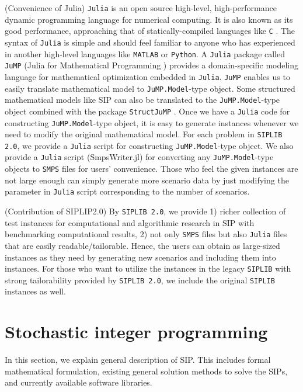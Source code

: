 (Convenience of Julia) \texttt{Julia} is an open source high-level, high-performance dynamic programming language for numerical computing. It is also known as its good performance, approaching that of statically-compiled languages like \texttt{C} \cite{journal:BEKS2017}. The syntax of \texttt{Julia} is simple and should feel familiar to anyone who has experienced in another high-level languages like \texttt{MATLAB} or \texttt{Python}. A \texttt{Julia} package called \texttt{JuMP} (Julia for Mathematical Programming \cite{web:JuMP}) provides a domain-specific modeling language for mathematical optimization embedded in \texttt{Julia}. \texttt{JuMP} enables us to easily translate mathematical model to \texttt{JuMP.Model}-type object. Some structured mathematical models like SIP can also be translated to the \texttt{JuMP.Model}-type object combined with the package \texttt{StructJuMP} \cite{web:StructJuMP}. Once we have a \texttt{Julia} code for constructing \texttt{JuMP.Model}-type object, it is easy to generate instances whenever we need to modify the original mathematical model. For each problem in \texttt{SIPLIB 2.0}, we provide a \texttt{Julia} script for constructing \texttt{JuMP.Model}-type object. We also provide a \texttt{Julia} script (SmpsWriter.jl) for converting any \texttt{JuMP.Model}-type objects to \texttt{SMPS} files for users' convenience. Those who feel the given instances are not large enough can simply generate more scenario data by just modifying the parameter in \texttt{Julia} script corresponding to the number of scenarios.

(Contribution of SIPLIP2.0) By \texttt{SIPLIB 2.0}, we provide 1) richer collection of test instances for computational and algorithmic research in SIP with benchmarking computational results, 2) not only \texttt{SMPS} files but also \texttt{Julia} files that are easily readable/tailorable. Hence, the users can obtain as large-sized instances as they need by generating new scenarios and including them into instances. For those who want to utilize the instances in the legacy \texttt{SIPLIB} with strong tailorability provided by \texttt{SIPLIB 2.0}, we include the original \texttt{SIPLIB} instances as well.

\section{Stochastic integer programming} \label{sec:SIP}
In this section, we explain general description of SIP. This includes formal mathematical formulation, existing general solution methods to solve the SIPs, and currently available software libraries.
